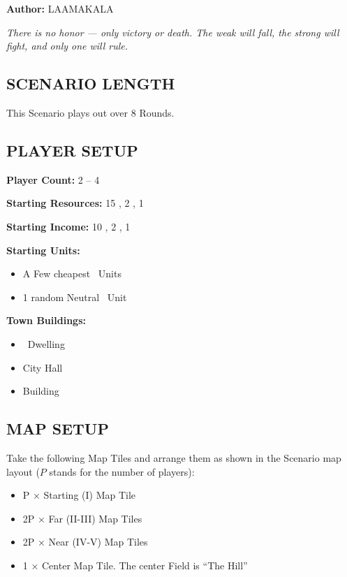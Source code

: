 
\begin{multicols*}{2}

\textbf{Author:} LAAMAKALA

\textit{There is no honor — only victory or death. The weak will fall, the strong will fight, and only one will rule.}

\subsection*{\MakeUppercase{Scenario Length}}
This Scenario plays out over 8 Rounds.

\subsection*{\MakeUppercase{Player Setup}}
\textbf{Player Count:} 2 -- 4

\textbf{Starting Resources:} 15 , 2 , 1 

\textbf{Starting Income:} 10 , 2 , 1 

\textbf{Starting Units:}
\begin{itemize}
  \item A Few cheapest \silver\ Units
  \item 1 random Neutral \bronze\ Unit
\end{itemize}

\textbf{Town Buildings:}
\begin{itemize}
  \item \bronze\ Dwelling
  \item City Hall
  \item {} Building
\end{itemize}

\subsection*{\MakeUppercase{Map Setup}}
Take the following Map Tiles and arrange them as shown in the Scenario map layout ($P$ stands for the number of players):

\begin{itemize}
  \item P × Starting (I) Map Tile
  \item 2P × Far (II-III) Map Tiles
  \item 2P × Near (IV-V) Map Tiles
  \item 1 × Center Map Tile. The center Field is ``The Hill''
\end{itemize}


\end{multicols*}
